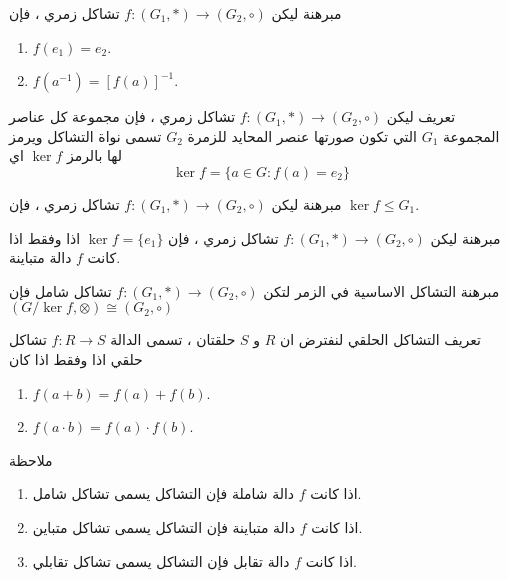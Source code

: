 		\begin{frame}
			\begin{exampleblock}{مبرهنة}
				ليكن 	$f : (G_1, *) \to (G_2, \circ)$ تشاكل زمري ، فإن
			\begin{enumerate}
				\item $f(e_1) = e_2$.
				\item  $f(a^{-1}) = [f(a)]^{-1}$.
			\end{enumerate}
		\end{exampleblock}
		
		\pause
		\begin{exampleblock}{تعريف}
					ليكن 	$f : (G_1, *) \to (G_2, \circ)$ تشاكل زمري ، فإن مجموعة كل عناصر المجموعة $G_1$ التي تكون صورتها عنصر المحايد للزمرة $G_2$ تسمى نواة التشاكل ويرمز لها بالرمز $\ker f$ اي
			\[
			\ker f = \{a\in G : f(a) = e_2\}
			\]
		\end{exampleblock}
		
		\pause
		\begin{exampleblock}{مبرهنة}
						ليكن 	$f : (G_1, *) \to (G_2, \circ)$ تشاكل زمري ، فإن $\ker f\leq G_1$.
		\end{exampleblock}
		
		\pause
		\begin{exampleblock}{مبرهنة}
								ليكن 	$f : (G_1, *) \to (G_2, \circ)$ تشاكل زمري ، فإن $\ker f=\{e_1\}$ اذا وفقط اذا كانت $f$ دالة متباينة.
		\end{exampleblock}
		\end{frame}
		
		\begin{frame}
		   \begin{exampleblock}{مبرهنة التشاكل الاساسية في الزمر}
		   	لتكن 
		   	$f : (G_1, *) \to (G_2, \circ)$ تشاكل شامل فإن 
		   	$(G/\ker f, \otimes) \cong (G_2, \circ)$
		   \end{exampleblock}
		   
		   \pause
		   \begin{exampleblock}{تعريف التشاكل الحلقي}
		   		لنفترض ان $R$ و $S$ حلقتان ، تسمى الدالة $f:R\to S$ تشاكل حلقي اذا وفقط اذا كان
		   	\setLR
		   	\begin{enumerate}
		   		\item $f(a + b) = f(a) + f(b)$.
		   		\item $f(a\cdot b) = f(a) \cdot f(b)$.
		   	\end{enumerate}
		   	\setRL
		   \end{exampleblock}
		   
		   \pause
		   \begin{exampleblock}{ملاحظة}
		   	\begin{enumerate}
		   		\item اذا كانت $f$ دالة شاملة فإن التشاكل يسمى تشاكل شامل.
		   		\item اذا كانت $f$ دالة متباينة فإن التشاكل يسمى تشاكل متباين.
		   		\item اذا كانت $f$ دالة تقابل فإن التشاكل يسمى تشاكل تقابلي.
		   	\end{enumerate}
		   \end{exampleblock}
		\end{frame}
		
